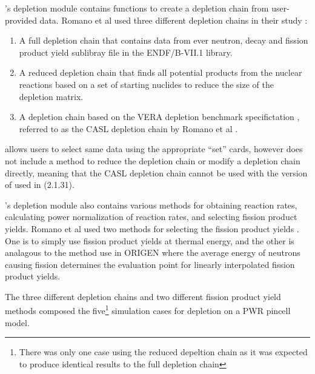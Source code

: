 \OpenMC's depletion module contains functions to create a depletion chain from
user-provided data. Romano et al used three different depletion chains in their
study \cite{romano_depletion_2021}:
\begin{enumerate}
    \item A full depletion chain that contains data from ever neutron, decay
        and fission product yield sublibray file in the ENDF/B-VII.1 library.
    \item A reduced depletion chain that finds all potential products from the
        nuclear reactions based on a set of starting nuclides to reduce the
        size of the depletion matrix.
    \item A depletion chain based on the VERA depletion benchmark
        specifictation \cite{kim_specification_2015}, referred to as the CASL
        depletion chain by Romano et al \cite{romano_depletion_2021}.
\end{enumerate}
\SerpentTWO allows users to select same data using the appropriate ``set''
cards, however does not include a method to reduce the depletion chain or
modify a depletion chain directly, meaning that the CASL depletion chain cannot
be used with the version of \SerpentTWO used in \cite{romano_depletion_2021}
(2.1.31).

\OpenMC's depletion module also contains various methods for obtaining reaction
rates, calculating power normalization of reaction rates, and selecting fission
product yields. Romano et al used two methods  for selecting the fission
product yields \cite{romano_depletion_2021}. One is to simply use fission product
yields at thermal energy, and the other is analagous to the method use in
ORIGEN \cite{gauld_isotopic_2011} where the average energy of neutrons causing
fission determines the evaluation point for linearly interpolated fission
product yields.

The three different depletion chains and two different fission product yield
methods composed the five\footnote{There was only one case using the reduced
depeltion chain as it was expected to produce identical results to the full
depletion chain} simulation cases for depletion on a PWR pincell model.

